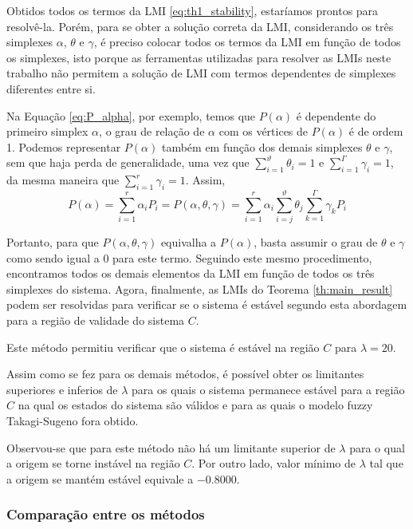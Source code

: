 Obtidos todos os termos da LMI \ref{eq:th1_stability}, estaríamos prontos para resolvê-la. Porém, para se obter a solução correta da LMI, considerando os três simplexes $\alpha$, $\theta$ e $\gamma$, é preciso colocar todos os termos da LMI em função de todos os simplexes, isto porque as ferramentas utilizadas para resolver as LMIs neste trabalho não permitem a solução de LMI com termos dependentes de simplexes diferentes entre si.

Na Equação \ref{eq:P_alpha}, por exemplo, temos que $P(\alpha)$ é dependente do primeiro simplex $\alpha$, o grau de relação de $\alpha$ com os vértices de $P(\alpha)$ é de ordem 1. Podemos representar $P(\alpha)$ também em função dos demais simplexes $\theta$ e $\gamma$, sem que haja perda de generalidade, uma vez que $\sum_{i = 1}^{\vartheta}\theta_i = 1$ e $\sum_{i = 1}^{\Gamma}\gamma_i = 1$, da mesma maneira que $\sum_{i = 1}^{r}\gamma_i = 1$. Assim,
\begin{equation}\label{P_multiple_simplexes}
P(\alpha) = \sum_{i = 1}^{r}\alpha_iP_i = P(\alpha, \theta,\gamma) = \sum_{i = 1}^{r}\alpha_i\sum_{i = j}^{\vartheta}\theta_j\sum_{k = 1}^{\Gamma}\gamma_kP_i
\end{equation}

Portanto, para que $ P(\alpha, \theta,\gamma)$ equivalha a $P(\alpha)$, basta assumir o grau de $\theta$ e $\gamma$ como sendo igual a 0 para este termo. Seguindo este mesmo procedimento, encontramos todos os demais elementos da LMI em função de todos os três simplexes do sistema. Agora, finalmente, as LMIs do Teorema \ref{th:main_result} podem ser resolvidas para verificar se o sistema é estável segundo esta abordagem para a região de validade do sistema $C$.

Este método permitiu verificar que o sistema é estável na região $C$ para $\lambda = 20$.

Assim como se fez para os demais métodos, é possível obter os limitantes superiores e inferios de $\lambda$ para os quais o sistema permanece estável para a região $C$ na qual os estados do sistema são válidos e para as quais o modelo fuzzy Takagi-Sugeno fora obtido.

Observou-se que para este método não há um limitante superior de $\lambda$ para o qual a origem se torne instável na região $C$. Por outro lado, valor mínimo de $\lambda$ tal que a origem se mantém estável equivale a $-0.8000$.

\subsubsection{Comparação entre os métodos}

